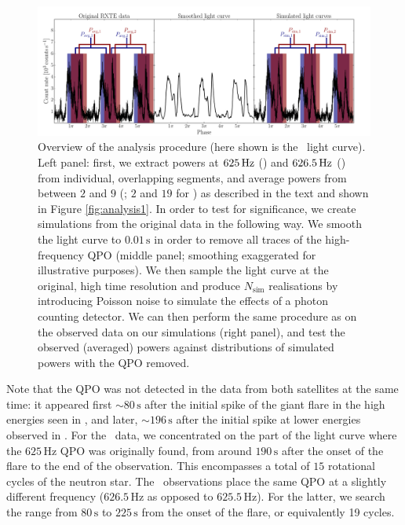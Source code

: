 \documentclass{emulateapj}
\begin{document}
\begin{figure}[htbp]
\begin{center}
\includegraphics[width=18cm]{f3.pdf}
\caption{Overview of the analysis procedure (here shown is the \rxte\ light curve). Left panel: first, we extract powers at $625\,\mathrm{Hz}$ (\rxte) and $626.5\,\mathrm{Hz}$ (\rhessi) from individual, overlapping segments, and average powers from between $2$ and $9$ (\rxte; $2$ and $19$ for \rhessi) as described in the text and shown in Figure \ref{fig:analysis1}. In order to test for significance, we create simulations from the original data in the following way. We smooth the light curve to $0.01\,\mathrm{s}$ in order to remove all traces of the high-frequency QPO (middle panel; smoothing exaggerated for illustrative purposes). We then sample the light curve at the original, high time resolution and produce $N_\mathrm{sim}$ realisations by introducing Poisson noise to simulate the effects of a photon counting detector. We can then perform the same procedure as on the observed data on our simulations (right panel), and test the observed (averaged) powers against distributions of simulated powers with the QPO removed.}
\label{fig:analysis2}
\end{center}
\end{figure}



Note that the QPO was not detected in the data from both satellites at the same time: it appeared first $\sim 80\,\mathrm{s}$ after the initial spike of the giant flare in the high energies seen in \rhessi, and later, $\sim 196 \,\mathrm{s}$ after the initial spike at lower energies observed in \rxte.
For the \rxte\ data, we concentrated on the part of the light curve where the $625 \, \mathrm{Hz}$ QPO was originally found, from around $190\, \mathrm{s}$ after the onset of the flare to the end of the observation. This encompasses a total of $15$ rotational cycles of the neutron star. The \rhessi\ observations place the same QPO at a slightly different frequency ($626.5 \, \mathrm{Hz}$ as opposed to $625.5 \, \mathrm{Hz}$). For the latter, we search the range from $80\, \mathrm{s}$ to $225 \, \mathrm{s}$ from the onset of the flare, or equivalently 19 cycles.
\end{document}
